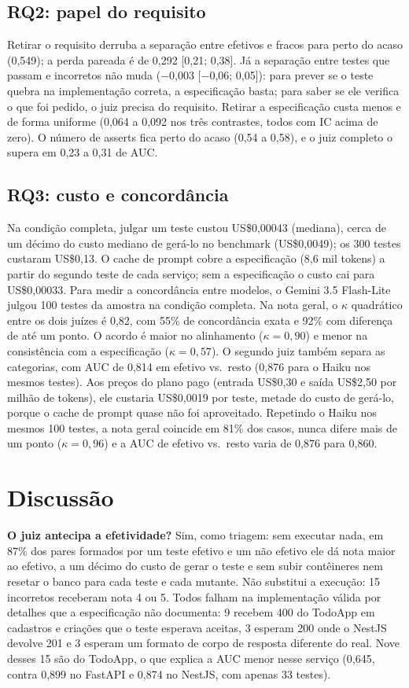 \documentclass[sigconf,nonacm]{acmart}
\begin{document}
\subsection{RQ2: papel do requisito}
Retirar o requisito derruba a separação entre efetivos e fracos para perto do acaso (0,549); a perda pareada
é de 0,292 [0,21; 0,38]. Já a separação entre testes que passam e incorretos não muda
($-$0,003 [$-$0,06; 0,05]): para prever se o teste quebra na implementação correta, a especificação basta;
para saber se ele verifica o que foi pedido, o juiz precisa do requisito. Retirar a especificação custa menos
e de forma uniforme (0,064 a 0,092 nos três contrastes, todos com IC acima de zero). O número de asserts fica
perto do acaso (0,54 a 0,58), e o juiz completo o supera em 0,23 a 0,31 de AUC.

\subsection{RQ3: custo e concordância}
Na condição completa, julgar um teste custou US\$0,00043 (mediana), cerca de um décimo do custo mediano de
gerá-lo no benchmark (US\$0,0049); os 300 testes custaram US\$0,13. O cache de prompt cobre a especificação
(8,6 mil tokens) a partir do segundo teste de cada serviço; sem a especificação o custo cai para US\$0,00033.
Para medir a concordância entre modelos, o Gemini 3.5 Flash-Lite julgou 100 testes da amostra na condição completa. Na nota
geral, o $\kappa$ quadrático entre os dois juízes é 0,82, com 55\% de concordância exata e 92\% com
diferença de até um ponto. O acordo é maior no alinhamento ($\kappa=0{,}90$) e menor na consistência com a
especificação ($\kappa=0{,}57$). O segundo juiz também separa as categorias, com AUC de 0,814 em efetivo
vs.\ resto (0,876 para o Haiku nos mesmos testes). Aos preços do plano pago (entrada US\$0,30 e saída US\$2,50
por milhão de tokens), ele custaria US\$0,0019 por teste, metade do custo de gerá-lo, porque o cache de prompt
quase não foi aproveitado. Repetindo o Haiku nos mesmos 100 testes, a nota geral coincide em 81\% dos casos,
nunca difere mais de um ponto ($\kappa=0{,}96$) e a AUC de efetivo vs.\ resto varia de 0,876 para 0,860.

\section{Discussão}
\textbf{O juiz antecipa a efetividade?} Sim, como triagem: sem executar nada, em 87\% dos pares formados por
um teste efetivo e um não efetivo ele dá nota maior ao efetivo, a um décimo do custo de gerar o teste e sem
subir contêineres nem resetar o banco para cada teste e cada mutante. Não substitui a
execução: 15 incorretos receberam nota 4 ou 5. Todos falham na implementação válida por detalhes que a
especificação não documenta: 9 recebem 400 do TodoApp em cadastros e criações que o teste esperava aceitas,
3 esperam 200 onde o NestJS devolve 201 e 3 esperam um formato de corpo de resposta diferente do real. Nove desses 15 são do TodoApp, o que explica a AUC menor nesse serviço
(0,645, contra 0,899 no FastAPI e 0,874 no NestJS, com apenas 33 testes).
\end{document}
